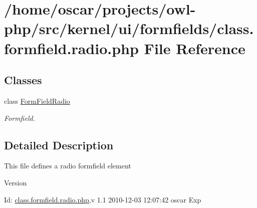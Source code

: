 \section{/home/oscar/projects/owl-\/php/src/kernel/ui/formfields/class.formfield.radio.php File Reference}
\label{class_8formfield_8radio_8php}
\subsection*{Classes}
\begin{DoxyCompactItemize}
\item 
class \hyperlink{classFormFieldRadio}{FormFieldRadio}
\begin{DoxyCompactList}\small\item\em Formfield. \item\end{DoxyCompactList}\end{DoxyCompactItemize}


\subsection{Detailed Description}
This file defines a radio formfield element \begin{DoxyVersion}{Version}

\end{DoxyVersion}
\begin{DoxyParagraph}{Id:}
\hyperlink{class_8formfield_8radio_8php}{class.formfield.radio.php},v 1.1 2010-\/12-\/03 12:07:42 oscar Exp 
\end{DoxyParagraph}
